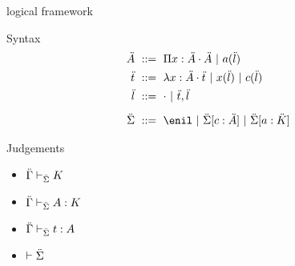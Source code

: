 \documentclass[ignorenonframetext,red]{beamer}
\begin{document}
\begin{frame}{ logical framework }
\begin{onlyenv}
\begin{block}{Syntax}
\begin{align*}
        \mf &\gequal { \prd\mv\mf\mf \gor \lapp\mcf\ma } \\
        \mo &\gequal { \lam\mv\mf\mo \gor \lapp\mv\ma \gor \lapp\mco\ma } \\
        \ma &\gequal { \lnil \gor \lcons\mo\ma} \\[0.5em]
        \msi &\gequal { \enil \gor \ebinddecl\msi\mco\mf \gor
          \ebinddecl\msi\mcf\mk }
      \end{align*}
    \end{block}
    \begin{block}{Judgements}
      \begin{itemize}
      \item ${\ddot{\Gamma}}\vdash_{\ddot{\Sigma}}{K}$
      \item ${\ddot{\Gamma}}\vdash_{\ddot{\Sigma}}{{A}:{K}}$
      \item ${\ddot{\Gamma}}\vdash_{\ddot{\Sigma}}{{t}:{A}}$
      \item $\vdash \ddot{\Sigma}$
      \end{itemize}
    \end{block}
  \end{onlyenv}
\end{frame}
\end{document}
